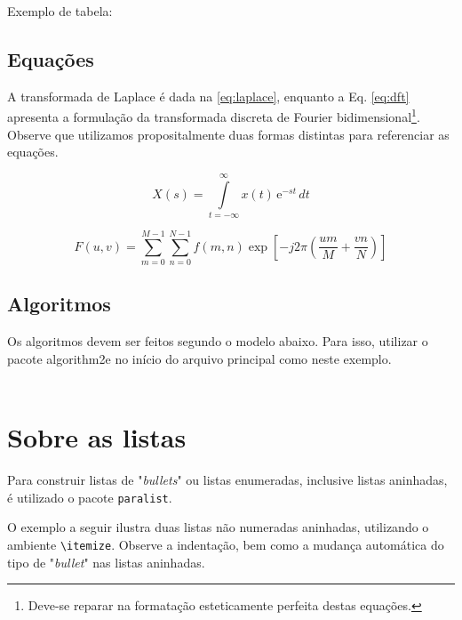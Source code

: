 \begin{apendicesenv}
Exemplo de tabela:



\section{Equações}
\label{sec:equacoes}

A transformada de Laplace é dada na \autoref{eq:laplace}, enquanto a Eq. \ref{eq:dft} apresenta a formulação da transformada discreta de Fourier bidimensional\footnote{Deve-se reparar na formatação esteticamente perfeita destas equações.}. Observe que utilizamos propositalmente duas formas distintas para referenciar as equações.

\begin{equation}
    X(s) = \int\limits_{t = -\infty}^{\infty} x(t) \, \text{e}^{-st} \, dt
    \label{eq:laplace}
\end{equation}

\begin{equation}
    F(u, v) = \sum_{m = 0}^{M - 1} \sum_{n = 0}^{N - 1} f(m, n) \exp \left[ -j 2 \pi \left( \frac{u m}{M} + \frac{v n}{N} \right) \right]
    \label{eq:dft}
\end{equation}

\section{Algoritmos}\label{sec:algoritmos}

Os algoritmos devem ser feitos segundo o modelo abaixo. Para isso, utilizar o pacote {\ttfamily algorithm2e} no início do arquivo principal como neste exemplo.
\\
\\




\chapter{Sobre as listas}
\label{chap:sobre_as_listas}

Para construir listas de "\textit{bullets}"{} ou listas enumeradas, inclusive listas aninhadas, é utilizado o pacote \verb|paralist|.

O exemplo a seguir ilustra duas listas não numeradas aninhadas, utilizando o ambiente \verb|\itemize|. Observe a indentação, bem como a mudança automática do tipo de "\textit{bullet}"{} nas listas aninhadas.


\end{apendicesenv}
